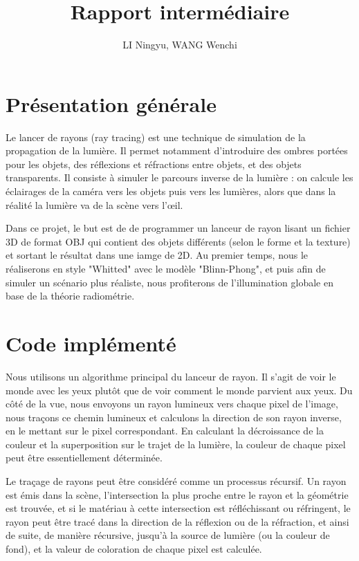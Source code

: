 \documentclass{article}
\title{Rapport intermédiaire}
\author{LI Ningyu, WANG Wenchi}
\begin{document}
\maketitle


\section{Présentation générale}
Le lancer de rayons (ray tracing) est une technique de simulation de la propagation de la lumière. Il permet notamment d’introduire des ombres portées pour les objets, des réflexions et réfractions entre objets, et des objets transparents. Il consiste à simuler le parcours inverse de la lumière : on calcule les éclairages de la caméra vers les objets puis vers les lumières, alors que dans la réalité la lumière va de la scène vers l'œil.

Dans ce projet, le but est de de programmer un lanceur de rayon lisant un fichier 3D de format OBJ qui contient des objets différents (selon le forme et la texture) et sortant le résultat dans une iamge de 2D. Au premier temps, nous le réaliserons en style "Whitted" avec le modèle "Blinn-Phong", et puis afin de simuler un scénario plus réaliste, nous profiterons de l'illumination globale en base de la théorie radiométrie.

\section{Code implémenté}

Nous utilisons un algorithme principal du lanceur de rayon. Il s’agit de voir le monde avec les yeux plutôt que de voir comment le monde parvient aux yeux. Du côté de la vue, nous envoyons un rayon lumineux vers chaque pixel de l’image, nous traçons ce chemin lumineux et calculons la direction de son rayon inverse, en le mettant sur le pixel correspondant. En calculant la décroissance de la couleur et la superposition sur le trajet de la lumière, la couleur de chaque pixel peut être essentiellement déterminée.

Le traçage de rayons peut être considéré comme un processus récursif. Un rayon est émis dans la scène, l’intersection la plus proche entre le rayon et la géométrie est trouvée, et si le matériau à cette intersection est réfléchissant ou réfringent, le rayon peut être tracé dans la direction de la réflexion ou de la réfraction, et ainsi de suite, de manière récursive, jusqu’à la source de lumière (ou la couleur de fond), et la valeur de coloration de chaque pixel est calculée.
\end{document}
